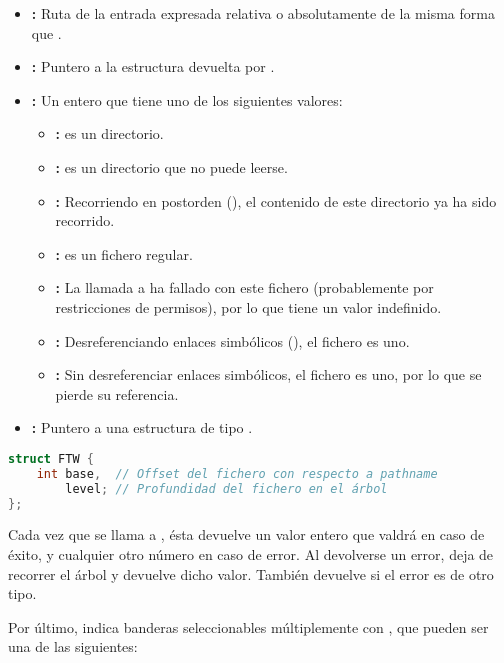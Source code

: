 \begin{itemize}
	\item{}\textbf{:} Ruta de la entrada expresada relativa o absolutamente de la misma forma que .
	\item{}\textbf{:} Puntero a la estructura  devuelta por .
	\item{}\textbf{:} Un entero que tiene uno de los siguientes valores:
	\begin{itemize}
		\item{}\textbf{:}  es un directorio.
		\item{}\textbf{:}  es un directorio que no puede leerse.
		\item{}\textbf{:} Recorriendo en postorden (), el contenido de este directorio ya ha sido recorrido.
		\item{}\textbf{:}  es un fichero regular.
		\item{}\textbf{:} La llamada a  ha fallado con este fichero (probablemente por restricciones de permisos), por lo que  tiene un valor indefinido.
		\item{}\textbf{:} Desreferenciando enlaces simbólicos (), el fichero es uno.
		\item{}\textbf{:} Sin desreferenciar enlaces simbólicos, el fichero es uno, por lo que se pierde su referencia.
	\end{itemize}
	\item{}\textbf{:} Puntero a una estructura de tipo .
\end{itemize}

\begin{lstlisting}[language=C]
struct FTW {
	int base,  // Offset del fichero con respecto a pathname
	    level; // Profundidad del fichero en el árbol
};
\end{lstlisting}

Cada vez que se llama a , ésta devuelve un valor entero que valdrá  en caso de éxito, y cualquier otro número en caso de error.
Al devolverse un error,  deja de recorrer el árbol y devuelve dicho valor.
También devuelve  si el error es de otro tipo.

Por último,  indica banderas seleccionables múltiplemente con , que pueden ser una de las siguientes:

